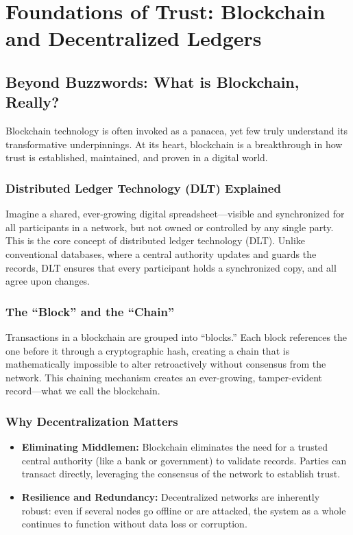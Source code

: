 \chapter{Foundations of Trust: Blockchain and Decentralized Ledgers}

\section{Beyond Buzzwords: What is Blockchain, Really?}
Blockchain technology is often invoked as a panacea, yet few truly understand its transformative underpinnings. At its heart, blockchain is a breakthrough in how trust is established, maintained, and proven in a digital world.

\subsection*{Distributed Ledger Technology (DLT) Explained}
Imagine a shared, ever-growing digital spreadsheet—visible and synchronized for all participants in a network, but not owned or controlled by any single party. This is the core concept of distributed ledger technology (DLT). Unlike conventional databases, where a central authority updates and guards the records, DLT ensures that every participant holds a synchronized copy, and all agree upon changes.

\subsection*{The “Block” and the “Chain”}
Transactions in a blockchain are grouped into “blocks.” Each block references the one before it through a cryptographic hash, creating a chain that is mathematically impossible to alter retroactively without consensus from the network. This chaining mechanism creates an ever-growing, tamper-evident record—what we call the blockchain.

\subsection*{Why Decentralization Matters}
\begin{itemize}
    \item \textbf{Eliminating Middlemen:} Blockchain eliminates the need for a trusted central authority (like a bank or government) to validate records. Parties can transact directly, leveraging the consensus of the network to establish trust.
    \item \textbf{Resilience and Redundancy:} Decentralized networks are inherently robust: even if several nodes go offline or are attacked, the system as a whole continues to function without data loss or corruption.
\end{itemize}

